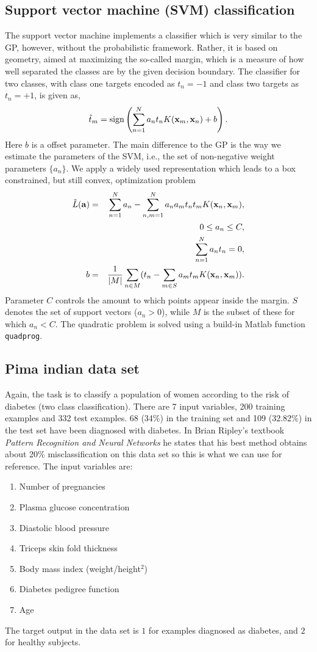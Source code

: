 \documentclass[12pt]{article}    %
\def\xb{{\bf x}}
\def\ab{{\bf a}}
\begin{document}
\subsection*{Support vector machine (SVM) classification  }
The support vector machine implements a classifier which is very similar to the GP, however, without the probabilistic framework. Rather, it is based on geometry, aimed at maximizing the so-called margin, which is a measure of how well separated the classes are by the given decision boundary.
The classifier for two classes, with class one targets encoded as $t_n = -1$ and class two targets as $t_n = +1$, is given as,
\begin{equation}
\hat{t}_m = {\rm sign} \left(\sum_{n=1}^N a_n t_n K(\xb_m,\xb_n) + b\right). \label{svm}
\end{equation}
Here $b$ is a offset parameter. The main difference to the GP is the way we estimate the parameters of the SVM, i.e., the set of non-negative weight parameters $\{a_n\}$. We  apply a widely used representation which leads to a box constrained, but still convex, optimization problem
\begin{eqnarray}
\tilde{L}(\ab) &= & \sum_{n=1}^N a_n - \sum_{n,m=1}^N a_n a_m t_n t_m K(\xb_n,\xb_m), \nonumber \\
&& 0   \leq  a_n \leq C, \nonumber \\
&& \sum_{n=1}^N a_n t_n  = 0,\nonumber \\
b &=& \frac{1}{|M|}\sum_{n\in M}( t_n -\sum_{m\in S}a_m t_m K(\xb_n,\xb_m)).  \nonumber
\end{eqnarray}
Parameter $C$ controls the amount to which points appear inside the margin.  $S$ denotes the set of support vectors ($a_n > 0$), while $M$ is the subset of these for which  $a_n < C$.
The quadratic problem is solved using a build-in Matlab function {\tt quadprog}.

\subsection*{Pima indian data set}
Again, the task is to classify a population of women according to the risk of diabetes (two class classification).
There are 7 input variables, 200 training examples and 332 test examples. 68 (34\%) in the training set and 109 (32.82\%) in the test
set have been diagnosed with diabetes. In Brian Ripley's textbook {\em Pattern Recognition and Neural Networks} he
states that his best method obtains about 20\% misclassification on this data set so this is what we can use for reference.
The input variables are:
\begin{enumerate}
\item Number of pregnancies
\item Plasma glucose concentration
\item Diastolic blood pressure
\item Triceps skin fold thickness
\item Body mass index (weight/height$^2$)
\item Diabetes pedigree function
\item Age
\end{enumerate}
The target output in the data set is $1$ for examples diagnosed as diabetes, and $2$ for healthy subjects.
\end{document}
